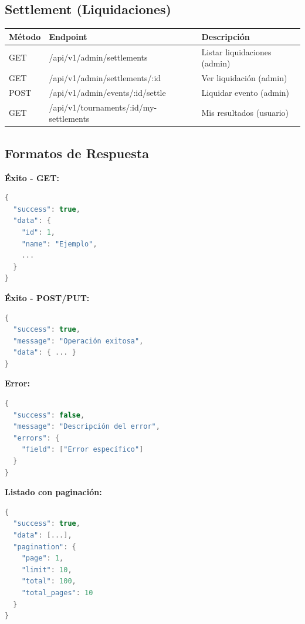 \documentclass[12pt,a4paper]{article}
\begin{document}
\subsection{Settlement (Liquidaciones)}
\begin{tabular}{|l|l|p{6cm}|}
\hline
\textbf{Método} & \textbf{Endpoint} & \textbf{Descripción} \\
\hline
GET & /api/v1/admin/settlements & Listar liquidaciones (admin) \\
GET & /api/v1/admin/settlements/:id & Ver liquidación (admin) \\
POST & /api/v1/admin/events/:id/settle & Liquidar evento (admin) \\
GET & /api/v1/tournaments/:id/my-settlements & Mis resultados (usuario) \\
\end{tabular}

\subsection{Formatos de Respuesta}

\textbf{Éxito - GET:}
\begin{lstlisting}[language=c]
{
  "success": true,
  "data": {
    "id": 1,
    "name": "Ejemplo",
    ...
  }
}
\end{lstlisting}

\textbf{Éxito - POST/PUT:}
\begin{lstlisting}[language=c]
{
  "success": true,
  "message": "Operación exitosa",
  "data": { ... }
}
\end{lstlisting}

\textbf{Error:}
\begin{lstlisting}[language=c]
{
  "success": false,
  "message": "Descripción del error",
  "errors": {
    "field": ["Error específico"]
  }
}
\end{lstlisting}

\textbf{Listado con paginación:}
\begin{lstlisting}[language=c]
{
  "success": true,
  "data": [...],
  "pagination": {
    "page": 1,
    "limit": 10,
    "total": 100,
    "total_pages": 10
  }
}
\end{lstlisting}

\newpage
\end{document}
